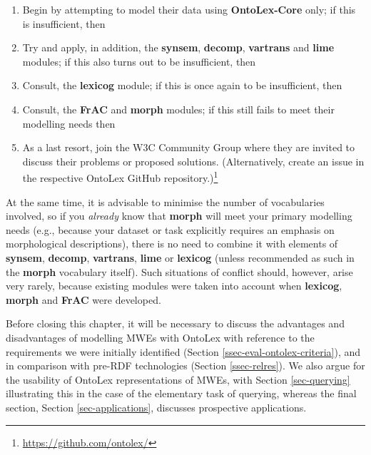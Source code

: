 \documentclass[output=paper,colorlinks,citecolor=brown]{langscibook}
\begin{document}
\begin{enumerate}
    \item Begin by attempting to model their data using \textbf{OntoLex-Core} only;  if  this is insufficient, then
    \item Try and apply, in addition, the \textbf{synsem}, \textbf{decomp}, \textbf{vartrans} and \textbf{lime} modules; if this also turns out to be insufficient, then
    \item Consult, the \textbf{lexicog} module; if this is once again to be insufficient, then
    \item Consult, the \textbf{FrAC} and \textbf{morph} modules; if this still fails to meet their modelling needs then
    \item As a last resort, join the W3C Community Group where they are invited to discuss their problems or proposed solutions. (Alternatively, create an issue in the respective OntoLex GitHub repository.)\footnote{\url{https://github.com/ontolex/}}
\end{enumerate}

\noindent
At the same time, it is advisable to minimise the number of vocabularies involved, so if you \textit{already} know that \textbf{morph} will meet your primary modelling needs (e.g., because your dataset or task explicitly requires an emphasis on morphological descriptions), there is no need to combine it with elements of \textbf{synsem}, \textbf{decomp}, \textbf{vartrans}, \textbf{lime} or \textbf{lexicog} (unless recommended as such in the \textbf{morph} vocabulary itself). Such situations of conflict should, however, arise very rarely, because existing modules were taken into account when \textbf{lexicog}, \textbf{morph} and \textbf{FrAC} were developed.

Before closing this chapter, it will be necessary to discuss the advantages and disadvantages of modelling MWEs with OntoLex with reference to the requirements we were initially identified (Section \ref{ssec-eval-ontolex-criteria}), and in comparison with pre-RDF technologies (Section \ref{ssec-relres}). We also argue for the usability of OntoLex representations of MWEs, with Section \ref{sec-querying} illustrating this in the case of the elementary task of querying, whereas the final section, Section \ref{sec-applications}, discusses prospective applications.
\end{document}
